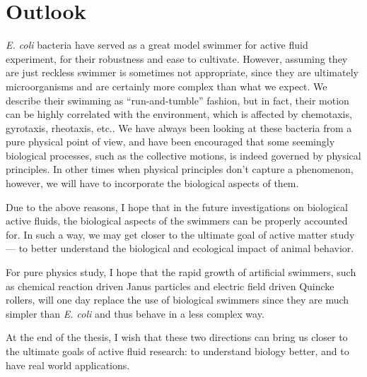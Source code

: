 \section{Outlook}

\textit{E. coli} bacteria have served as a great model swimmer for active fluid experiment, for their robustness and ease to cultivate. However, assuming they are just reckless swimmer is sometimes not appropriate, since they are ultimately microorganisms and are certainly more complex than what we expect. We describe their swimming as ``run-and-tumble'' fashion, but in fact, their motion can be highly correlated with the environment, which is affected by chemotaxis, gyrotaxis, rheotaxis, etc.. We have always been looking at these bacteria from a pure physical point of view, and have been encouraged that some seemingly biological processes, such as the collective motions, is indeed governed by physical principles. In other times when physical principles don't capture a phenomenon, however, we will have to incorporate the biological aspects of them.

Due to the above reasons, I hope that in the future investigations on biological active fluids, the biological aspects of the swimmers can be properly accounted for. In such a way, we may get closer to the ultimate goal of active matter study --- to better understand the biological and ecological impact of animal behavior.

For pure physics study, I hope that the rapid growth of artificial swimmers, such as chemical reaction driven Janus particles and electric field driven Quincke rollers, will one day replace the use of biological swimmers since they are much simpler than \textit{E. coli} and thus behave in a less complex way.

At the end of the thesis, I wish that these two directions can bring us closer to the ultimate goals of active fluid research: to understand biology better, and to have real world applications.

